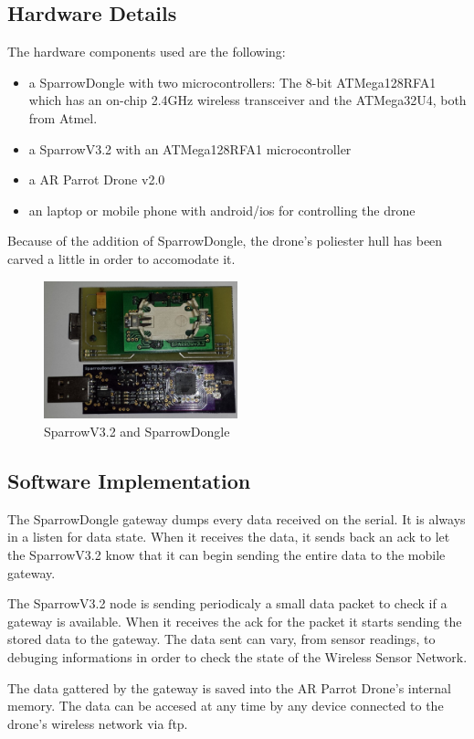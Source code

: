 \label{chap:impl}

 \subsection{Hardware Details}

The hardware components used are the following:
\begin{itemize}

\item a SparrowDongle with two microcontrollers: The 8-bit ATMega128RFA1 which has an on-chip 2.4GHz wireless transceiver and the ATMega32U4, both from Atmel.

\item a SparrowV3.2  with an ATMega128RFA1 microcontroller 

\item a AR Parrot Drone v2.0

\item an laptop or mobile phone with android/ios for controlling the drone

\end{itemize}

Because of the addition of SparrowDongle, the drone's poliester hull has been carved a little in order to accomodate it.


\begin{figure}[ht] \centering
\includegraphics[width=0.5\textwidth]{img/sparrow.jpg} \caption{SparrowV3.2 and SparrowDongle} \end{figure}



\subsection{Software Implementation}

The SparrowDongle gateway dumps every data received on the serial. It is always in a listen for data state. When it receives the data, it sends back an ack to let the SparrowV3.2 know that it can begin sending the entire data to the mobile gateway.

The SparrowV3.2 node is sending periodicaly a small data packet to check if a gateway is available. When it receives the ack for the packet it starts sending the stored data to the gateway. The data sent can vary, from sensor readings, to debuging informations in order to check the state of the Wireless Sensor Network.

The data gattered by the gateway is saved into the AR Parrot Drone's internal memory. The data can be accesed at any time by any device connected to the drone's wireless network via ftp.
